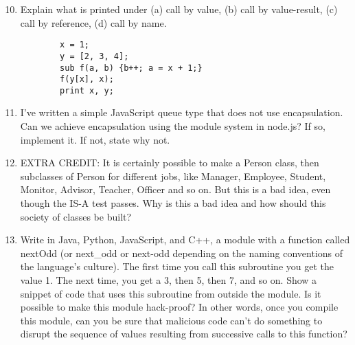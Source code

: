 \documentclass{article}
\begin{document}
\begin{enumerate}
	\setcounter{enumi}{9}
	\pagebreak
	\item Explain what is printed under (a) call by value, (b) call by value-result, (c) call by reference, (d) call by name.
	\begin{verbatim}
		x = 1;
		y = [2, 3, 4];
		sub f(a, b) {b++; a = x + 1;}
		f(y[x], x);
		print x, y;
	\end{verbatim}
	\pagebreak
	\item I've written a simple JavaScript queue type that does not use encapsulation. Can we achieve encapsulation using the module system in node.js? If so, implement it. If not, state why not.
	\pagebreak
	\item EXTRA CREDIT: It is certainly possible to make a Person class, then subclasses of Person for different jobs, like Manager, Employee, Student, Monitor, Advisor, Teacher, Officer and so on. But this is a bad idea, even though the IS-A test passes. Why is this a bad idea and how should this society of classes be built?
	\pagebreak
	\item Write in Java, Python, JavaScript, and C++, a module with a function called nextOdd (or next\_odd or next-odd depending on the naming conventions of the language's culture). The first time you call this subroutine you get the value 1. The next time, you get a 3, then 5, then 7, and so on. Show a snippet of code that uses this subroutine from outside the module. Is it possible to make this module hack-proof? In other words, once you compile this module, can you be sure that malicious code can't do something to disrupt the sequence of values resulting from successive calls to this function?
\end{enumerate}
\end{document}
